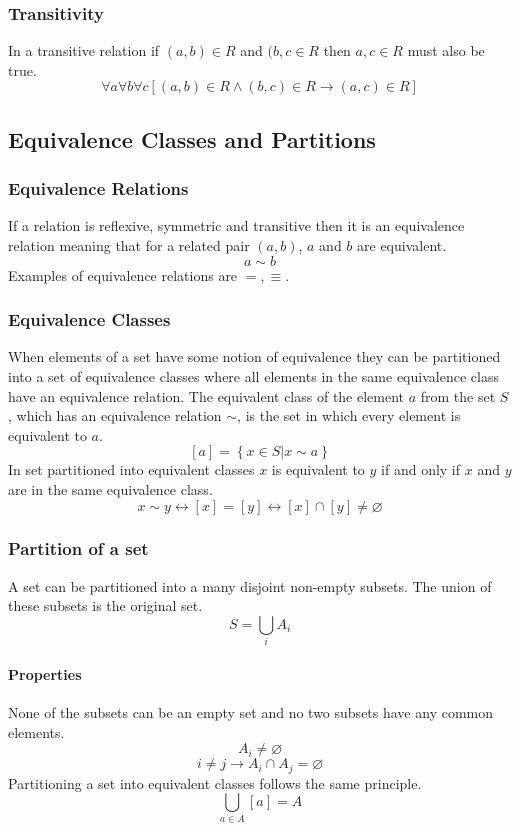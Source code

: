 \documentclass[a4paper, 10pt]{article}
\begin{document}
\subsubsection{Transitivity}
In a transitive relation if \((a,b)\in R\) and \((b,c \in R\) then \(a,c\in R\) must also be true.
\[ \forall a\forall b\forall c[(a,b)\in R\land (b,c)\in R\rightarrow (a,c)\in R] \]

\subsection{Equivalence Classes and Partitions}
\subsubsection{Equivalence Relations}
If a relation is reflexive, symmetric and transitive then it is an equivalence relation meaning that for a related pair \((a,b)\), \(a\) and \(b\) are equivalent.
\[ a\sim b \]
Examples of equivalence relations are \(=,\equiv\).

\subsubsection{Equivalence Classes}
When elements of a set have some notion of equivalence they can be partitioned into a set of equivalence classes where all elements in the same equivalence class have an equivalence relation. The equivalent class of the element \(a\) from the set \(S\), which has an equivalence relation \(\sim\), is the set in which every element is equivalent to \(a\).
\[ [a] = \left\{x\in S|x\sim a\right\} \]
In set partitioned into equivalent classes \(x\) is equivalent to \(y\) if and only if \(x\) and \(y\) are in the same equivalence class.
\[ x\sim y \leftrightarrow [x]=[y] \leftrightarrow [x]\cap[y]\not=\varnothing \]

\subsubsection{Partition of a set}
A set can be partitioned into a many disjoint non-empty subsets. The union of these subsets is the original set.
\[ S = \bigcup_i A_i \]
\paragraph{Properties}
None of the subsets can be an empty set and no two subsets have any common elements.
\[ A_i \not= \varnothing \]
\[ i\not=j \rightarrow A_i\cap A_j = \varnothing \]
Partitioning a set into equivalent classes follows the same principle.
\[ \bigcup_{a\in A} [a] = A \]
\end{document}
